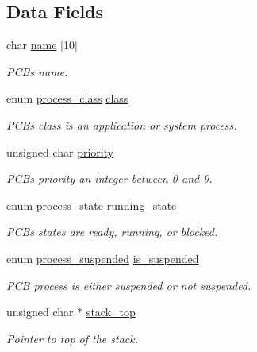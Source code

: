 \subsection*{Data Fields}
\begin{DoxyCompactItemize}
\item 
char \hyperlink{structpcb__struct_a2bd5a2bbfc9b13812cec1c884077930e}{name} \mbox{[}10\mbox{]}
\begin{DoxyCompactList}\small\item\em P\+CB\textquotesingle{}s name. \end{DoxyCompactList}\item 
enum \hyperlink{pcb_8h_aefe309d62b55b4d0be96f1a97fcbbadd}{process\+\_\+class} \hyperlink{structpcb__struct_a3957f5586930529631c9a428a30b7325}{class}
\begin{DoxyCompactList}\small\item\em P\+CB\textquotesingle{}s class is an application or system process. \end{DoxyCompactList}\item 
unsigned char \hyperlink{structpcb__struct_aff2a92397b2ef3d680c09934ecd5f032}{priority}
\begin{DoxyCompactList}\small\item\em P\+CB\textquotesingle{}s priority an integer between 0 and 9. \end{DoxyCompactList}\item 
enum \hyperlink{pcb_8h_a4e1a76273cf189daed25256e3ba34aef}{process\+\_\+state} \hyperlink{structpcb__struct_a374d522318eb94188698cbb5bd85009d}{running\+\_\+state}
\begin{DoxyCompactList}\small\item\em P\+CB\textquotesingle{}s states are ready, running, or blocked. \end{DoxyCompactList}\item 
enum \hyperlink{pcb_8h_ac80b09976226d1f179d0911462a93034}{process\+\_\+suspended} \hyperlink{structpcb__struct_aefb20b3b3c88e40e18ed2b505262d788}{is\+\_\+suspended}
\begin{DoxyCompactList}\small\item\em P\+CB process is either suspended or not suspended. \end{DoxyCompactList}\item 
unsigned char $\ast$ \hyperlink{structpcb__struct_a277e7babba5b14dc71ffc08bf69f54c3}{stack\+\_\+top}
\begin{DoxyCompactList}\small\item\em Pointer to top of the stack. \end{DoxyCompactList}\item 

\end{DoxyCompactItemize}
